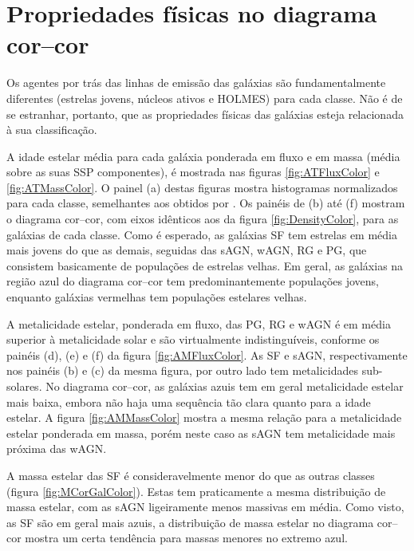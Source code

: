 
\section{Propriedades físicas no diagrama cor--cor}
\label{sec:Analise:PropFisicas}

Os agentes por trás das linhas de emissão das galáxias são fundamentalmente
diferentes (estrelas jovens, núcleos ativos e HOLMES) para cada classe. Não é de
se estranhar, portanto, que as propriedades físicas das galáxias esteja
relacionada à sua classificação.

A idade estelar média para cada galáxia ponderada em fluxo e em massa (média
sobre as suas SSP componentes), é mostrada nas figuras \ref{fig:ATFluxColor} e
\ref{fig:ATMassColor}. O painel (a) destas figuras mostra histogramas
normalizados para cada classe, semelhantes aos obtidos por \citet[figura
10]{CidFernandes2011}. Os painéis de (b) até (f) mostram o diagrama cor--cor,
com eixos idênticos aos da figura \ref{fig:DensityColor}, para as galáxias de
cada classe. Como é esperado, as galáxias SF tem estrelas em média mais jovens
do que as demais, seguidas das sAGN, wAGN, RG e PG, que consistem basicamente de
populações de estrelas velhas. Em geral, as galáxias na região azul do diagrama
cor--cor tem predominantemente populações jovens, enquanto galáxias vermelhas
tem populações estelares velhas.

A metalicidade estelar, ponderada em fluxo, das PG, RG e wAGN é em média
superior à metalicidade solar e são virtualmente indistinguíveis, conforme os
painéis (d), (e) e (f) da figura \ref{fig:AMFluxColor}. As SF e sAGN,
respectivamente nos painéis (b) e (c) da mesma figura, por outro lado tem
metalicidades sub-solares. No diagrama cor--cor, as galáxias azuis tem em geral
metalicidade estelar mais baixa, embora não haja uma sequência tão clara quanto
para a idade estelar. A figura \ref{fig:AMMassColor} mostra a mesma relação para
a metalicidade estelar ponderada em massa, porém neste caso as sAGN tem
metalicidade mais próxima das wAGN.

A massa estelar das SF é consideravelmente menor do que as outras classes
(figura \ref{fig:MCorGalColor}). Estas tem praticamente a mesma distribuição de
massa estelar, com as sAGN ligeiramente menos massivas em média. Como visto, as
SF são em geral mais azuis, a distribuição de massa estelar no diagrama cor--cor
mostra um certa tendência para massas menores no extremo azul.

